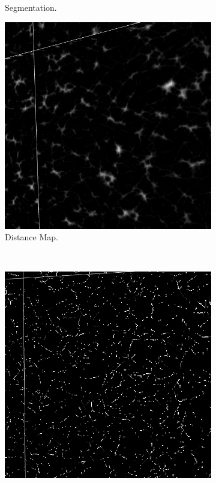 \begin{figure}[H]
\begin{subfigure}{0.5\textwidth}
    \caption{Segmentation.}
    \label{fig:actin_segmentation}
  \end{subfigure}%
  \begin{subfigure}{0.5\textwidth}
    \centering
    \includegraphics[width=0.9\linewidth]{Figures/chapter-image/pipeline_screenshots/actin_dmap.png}
    \caption{Distance Map.}
    \label{subfig:actin_dmap}
  \end{subfigure}\\[1ex]
  \begin{subfigure}{0.5\textwidth}
    \centering
    \includegraphics[width=0.9\linewidth]{Figures/chapter-image/pipeline_screenshots/actin_skeleton.png}

\end{subfigure}
\end{figure}
